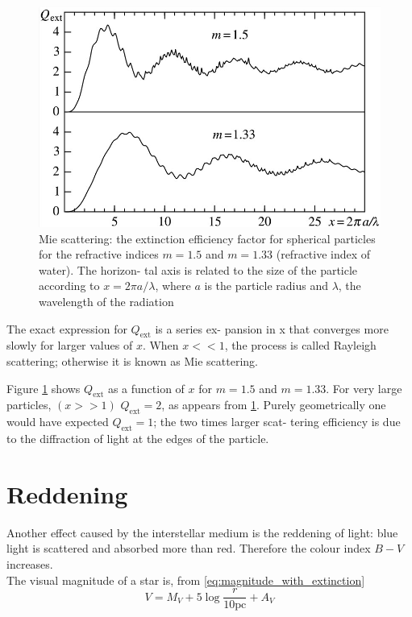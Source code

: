 \documentclass[a4paper,11pt,twoside]{book}
\begin{document}
\begin{figure}[H]
	\centering
	\includegraphics[width=\linewidth]{images/absorb_coefficient.jpg}
	\caption{Mie scattering: the extinction efficiency factor
		for spherical particles for the refractive indices $m = 1.5$
		and $m = 1.33$ (refractive index of water). The horizon-
		tal axis is related to the size of the particle according to
		$x = 2\pi a/\lambda$, where $a$ is the particle radius and $\lambda$, the wavelength of the radiation}
	\label{fig:absorb_coefficient}
\end{figure}

The exact expression for $Q_\textrm{ext}$ is a series ex-
pansion in x that converges more slowly for
larger values of $x$. When $x << 1$, the process is
called Rayleigh scattering; otherwise it is known as Mie scattering.

Figure \ref{fig:absorb_coefficient} shows $Q_\textrm{ext}$ as
a function of $x$ for $m = 1.5$ and $m = 1.33$. For
very large particles, $(x>>1)$ $Q_\textrm{ext}=2$, as appears
from \ref{fig:absorb_coefficient}. Purely geometrically one would
have expected $Q_\textrm{ext}=1$; the two times larger scat-
tering efficiency is due to the diffraction of light
at the edges of the particle.


\section{Reddening}

Another effect caused by the interstellar medium is the reddening of light: blue light is scattered and absorbed more than red.
Therefore the colour index $B-V$ increases.\\

The visual magnitude of a star is, from \eqref{eq:magnitude_with_extinction}
\begin{equation}
	V = M_V + 5 \log \frac{r}{10 \textrm{pc}}+ A_V
\end{equation}
\end{document}
